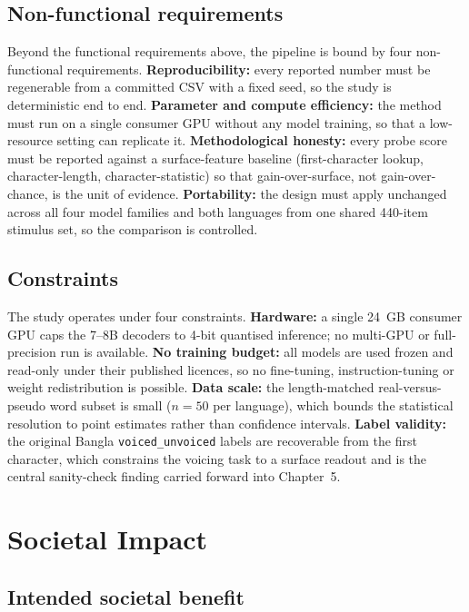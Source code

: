 \subsection*{Non-functional requirements}

Beyond the functional requirements above, the pipeline is bound by four non-functional requirements. \textbf{Reproducibility:} every reported number must be regenerable from a committed CSV with a fixed seed, so the study is deterministic end to end. \textbf{Parameter and compute efficiency:} the method must run on a single consumer GPU without any model training, so that a low-resource setting can replicate it. \textbf{Methodological honesty:} every probe score must be reported against a surface-feature baseline (first-character lookup, character-length, character-statistic) so that gain-over-surface, not gain-over-chance, is the unit of evidence. \textbf{Portability:} the design must apply unchanged across all four model families and both languages from one shared 440-item stimulus set, so the comparison is controlled.

\subsection*{Constraints}

The study operates under four constraints. \textbf{Hardware:} a single 24~GB consumer GPU caps the 7--8B decoders to 4-bit quantised inference; no multi-GPU or full-precision run is available. \textbf{No training budget:} all models are used frozen and read-only under their published licences, so no fine-tuning, instruction-tuning or weight redistribution is possible. \textbf{Data scale:} the length-matched real-versus-pseudo word subset is small ($n = 50$ per language), which bounds the statistical resolution to point estimates rather than confidence intervals. \textbf{Label validity:} the original Bangla \texttt{voiced\_unvoiced} labels are recoverable from the first character, which constrains the voicing task to a surface readout and is the central sanity-check finding carried forward into Chapter~5.

\section{Societal Impact}

\subsection*{Intended societal benefit}

